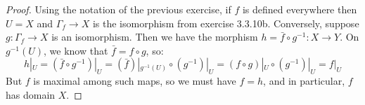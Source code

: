 \begin{proof}
	Using the notation of the previous exercise, if $f$ is defined everywhere then $U = X$ and $\Gamma_f \to X$ is the isomorphism from exercise 3.3.10b. Conversely, suppose $g : \Gamma_f \to X$ is an isomorphism. Then we have the morphism $h = \bar{f} \circ g^{-1} : X \to Y$. On $g^{-1}(U)$, we know that $\bar{f} = f \circ g$, so:
	\[ h|_U = (\bar{f} \circ g^{-1})|_U = (\bar{f})|_{g^{-1}(U)} \circ (g^{-1})|_U = (f \circ g)|_U \circ (g^{-1})|_U = f|_U \]
	But $f$ is maximal among such maps, so we must have $f = h$, and in particular, $f$ has domain $X$.
\end{proof}
